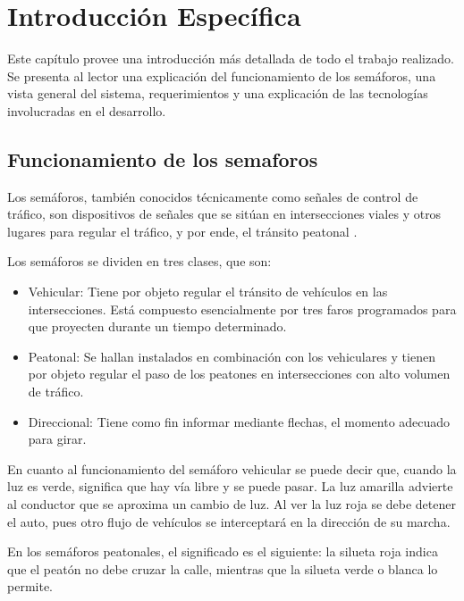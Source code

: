 \chapter{Introducción Específica} %

\label{Chapter2}


Este capítulo provee una introducción más detallada de todo el trabajo realizado.
Se presenta al lector una explicación del funcionamiento  de los semáforos, una vista general del sistema, requerimientos y una explicación de las tecnologías involucradas en el desarrollo.

\section{Funcionamiento de los semaforos}

Los semáforos, también conocidos técnicamente como señales de control de tráfico, son dispositivos de señales que se sitúan en intersecciones viales y otros lugares para regular el tráfico, y por ende, el tránsito peatonal \citep{semaforo}.

Los semáforos se dividen en tres clases, que son: 

\begin{itemize}
\item Vehicular: Tiene por objeto regular el tránsito de vehículos en las intersecciones. Está compuesto esencialmente por tres faros programados para que proyecten durante un tiempo determinado.
\item Peatonal: Se hallan instalados en combinación con los vehiculares y tienen por objeto regular el paso de los peatones en intersecciones con alto volumen de tráfico.
\item Direccional: Tiene como fin informar mediante flechas, el momento adecuado para girar. 
\end{itemize}

En cuanto al funcionamiento del semáforo vehicular se puede decir que, cuando la luz es verde, significa que hay vía libre y se puede pasar. La luz amarilla advierte al conductor que se aproxima un cambio de luz. Al ver la luz roja se debe detener el auto, pues otro flujo de vehículos se interceptará en la dirección de su marcha.

En los semáforos peatonales, el significado es el siguiente: la silueta roja indica que el peatón no debe cruzar la calle, mientras que la silueta verde o blanca lo permite.

